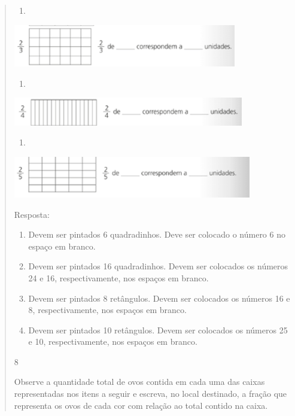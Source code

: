 \begin{mdframed}[linewidth=2pt,linecolor=salmao,roundcorner=2pt]
\begin{itemize}
{\begin{itemize}
\begin{escolha}
{\begin{quote}
{\begin{escolha}
{{{{\begin{enumerate}
\item
\end{enumerate}

\includegraphics[width=3.83367in,height=0.72506in]{media/image115.png}

\begin{enumerate}
\item
\end{enumerate}

\includegraphics[width=3.95868in,height=0.48337in]{media/image116.png}

\begin{enumerate}
\item
\end{enumerate}

\includegraphics[width=4.09202in,height=0.70839in]{media/image117.png}

Resposta:

\begin{enumerate}
\item
  Devem ser pintados 6 quadradinhos. Deve ser colocado o número 6 no espaço em
  branco.
\item
  Devem ser pintados 16 quadradinhos. Devem ser colocados os números 24 e 16,
  respectivamente, nos espaços em branco.
\item
  Devem ser pintados 8 retângulos. Devem ser colocados os números 16 e 8,
  respectivamente, nos espaços em branco.
\item
  Devem ser pintados 10 retângulos. Devem ser colocados os números 25 e 10,
  respectivamente, nos espaços em branco.
\end{enumerate}

\num{8}

Observe a quantidade total de ovos contida em cada uma das caixas
representadas nos itens a seguir e escreva, no local destinado, a fração que
representa os ovos de cada cor com relação ao total contido na caixa.

}}}}
\end{escolha}}
\end{quote}}
\end{escolha}
\end{itemize}}
\end{itemize}
\end{mdframed}
